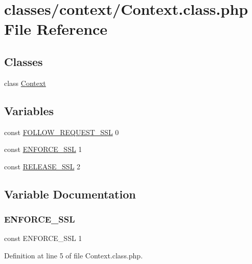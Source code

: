 \hypertarget{Context_8class_8php}{}\section{classes/context/\+Context.class.\+php File Reference}
\label{Context_8class_8php}
\subsection*{Classes}
\begin{DoxyCompactItemize}
\item 
class \hyperlink{classContext}{Context}
\end{DoxyCompactItemize}
\subsection*{Variables}
\begin{DoxyCompactItemize}
\item 
const \hyperlink{Context_8class_8php_a546ef85538017b41b2928e818066989d}{F\+O\+L\+L\+O\+W\+\_\+\+R\+E\+Q\+U\+E\+S\+T\+\_\+\+S\+SL} 0
\item 
const \hyperlink{Context_8class_8php_aa778d0999efa2a353d4d0876fd0f9f7b}{E\+N\+F\+O\+R\+C\+E\+\_\+\+S\+SL} 1
\item 
const \hyperlink{Context_8class_8php_a435293ef88053f90feaa2abf807fb6a3}{R\+E\+L\+E\+A\+S\+E\+\_\+\+S\+SL} 2
\end{DoxyCompactItemize}


\subsection{Variable Documentation}
\hypertarget{Context_8class_8php_aa778d0999efa2a353d4d0876fd0f9f7b}{}\label{Context_8class_8php_aa778d0999efa2a353d4d0876fd0f9f7b} 
\subsubsection{\texorpdfstring{E\+N\+F\+O\+R\+C\+E\+\_\+\+S\+SL}{ENFORCE\_SSL}}
{\footnotesize\ttfamily const E\+N\+F\+O\+R\+C\+E\+\_\+\+S\+SL 1}



Definition at line 5 of file Context.\+class.\+php.

